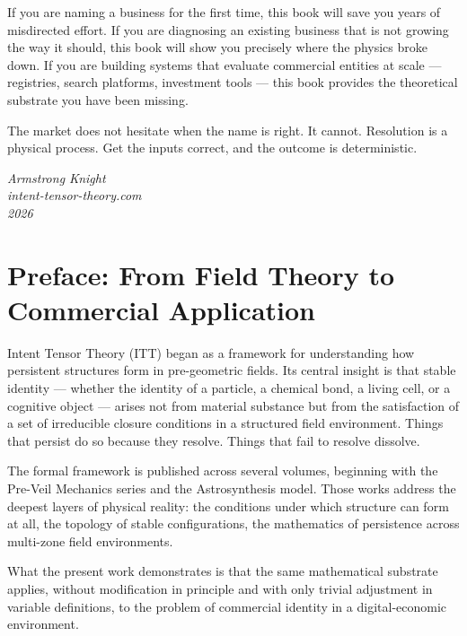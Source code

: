 \documentclass[12pt, openany]{book}
\theoremstyle{thmstyle}
\theoremstyle{defstyle}
\begin{document}
If you are naming a business for the first time, this book will save you years of misdirected effort. If you are diagnosing an existing business that is not growing the way it should, this book will show you precisely where the physics broke down. If you are building systems that evaluate commercial entities at scale --- registries, search platforms, investment tools --- this book provides the theoretical substrate you have been missing.

The market does not hesitate when the name is right. It cannot. Resolution is a physical process. Get the inputs correct, and the outcome is deterministic.

\vspace{16pt}
\begin{flushright}
\textit{Armstrong Knight}\\
\textit{intent-tensor-theory.com}\\
\textit{2026}
\end{flushright}

\newpage

\chapter*{Preface: From Field Theory to Commercial Application}

Intent Tensor Theory (ITT) began as a framework for understanding how persistent structures form in pre-geometric fields. Its central insight is that stable identity --- whether the identity of a particle, a chemical bond, a living cell, or a cognitive object --- arises not from material substance but from the satisfaction of a set of irreducible closure conditions in a structured field environment. Things that persist do so because they resolve. Things that fail to resolve dissolve.

The formal framework is published across several volumes, beginning with the Pre-Veil Mechanics series and the Astrosynthesis model. Those works address the deepest layers of physical reality: the conditions under which structure can form at all, the topology of stable configurations, the mathematics of persistence across multi-zone field environments.

What the present work demonstrates is that the same mathematical substrate applies, without modification in principle and with only trivial adjustment in variable definitions, to the problem of commercial identity in a digital-economic environment.
\end{document}
